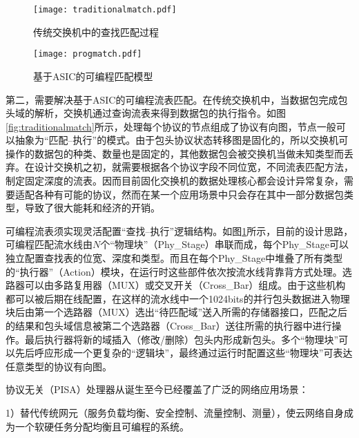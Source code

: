 \begin{figure}[htbp]
	\centering
	\begin{minipage}[t]{0.48\textwidth}
		\centering
		\texttt{[image: traditionalmatch.pdf]}
		\caption{传统交换机中的查找匹配过程} \label{fig:traditionalmatch}
	\end{minipage}
	\begin{minipage}[t]{0.48\textwidth}
		\centering
		\texttt{[image: progmatch.pdf]}%
		\caption{基于ASIC的可编程匹配模型} \label{fig:progmatch}
	\end{minipage}
\end{figure}

第二，需要解决基于ASIC的可编程流表匹配。在传统交换机中，当数据包完成包头域的解析，交换机通过查询流表来得到数据包的执行指令。如图\ref{fig:traditionalmatch}所示，处理每个协议的节点组成了协议有向图，节点一般可以抽象为“匹配--执行”的模式。由于包头协议状态转移图是固化的，所以交换机可操作的数据包的种类、数量也是固定的，其他数据包会被交换机当做未知类型而丢弃。在设计交换机之初，就需要根据各个协议字段不同位宽，不同流表匹配方法，制定固定深度的流表。因而目前固化交换机的数据处理核心都会设计异常复杂，需要适配各种有可能的协议，然而在某一个应用场景中只会存在其中一部分数据包类型，导致了很大能耗和经济的开销。





可编程流表须实现灵活配置“查找--执行”逻辑结构。如图\ref{fig:progmatch}所示，目前的设计思路，可编程匹配流水线由$N$个“物理块”（Phy\_Stage）串联而成，每个Phy\_Stage可以独立配置查找表的位宽、深度和类型。而且在每个Phy\_Stage中堆叠了所有类型的“执行器”（Action）模块，在运行时这些部件依次按流水线背靠背方式处理。选路器可以由多路复用器（MUX）或交叉开关（Cross\_Bar）组成。由于这些机构都可以被后期在线配置，在这样的流水线中一个1024bits的并行包头数据进入物理块后由第一个选路器（MUX）选出“待匹配域”送入所需的存储器接口，匹配之后的结果和包头域信息被第二个选路器（Cross\_Bar）送往所需的执行器中进行操作。最后执行器将新的域插入（修改/删除）包头内形成新包头。多个“物理块”可以先后呼应形成一个更复杂的“逻辑块”，最终通过运行时配置这些“物理块”可表达任意类型的协议有向图。


\label{chap233}
协议无关（PISA）处理器从诞生至今已经覆盖了广泛的网络应用场景：

1）替代传统网元（服务负载均衡、安全控制、流量控制、测量），使云网络自身成为一个软硬任务分配均衡且可编程的系统。

